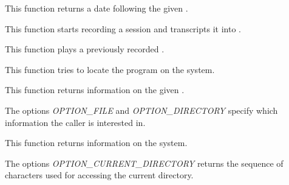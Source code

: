          {
	   This function returns a date following the given .
	 }

         {
	   This function starts recording a session and transcripts it
           into .
	 }

         {
	   This function plays a previously recorded .
	 }

         {
	   This function tries to locate the program 
	   on the system.
	 }

         {
	   This function returns information on the given .

	   \-

	   The options \textit{OPTION\_FILE} and \textit{OPTION\_DIRECTORY}
	   specify which information the caller is interested in.
	 }

         {
	   This function returns information on the system.

	   \-

	   The options \textit{OPTION\_CURRENT\_DIRECTORY} returns the
           sequence of characters used for accessing the current directory.
	 }
